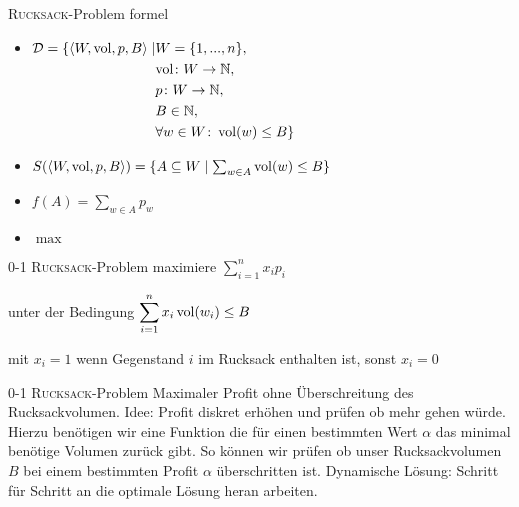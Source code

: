 \begin{frame}{\textsc{Rucksack}-Problem formel}
    \begin{itemize}
        \item $\begin{aligned}[t] 
            \mathcal{D}=\{\langle W,\operatorname{vol},p,B \rangle \mid & W=\{1,...,n\}, & \\
                                                                & \text{vol} \colon W \to \mathbb{N}, & \\
                                                                & p \colon W \to \mathbb{N}, & \\
                                                                & B \in \mathbb{N}, & \\
                                                                & \forall w \in W \colon \operatorname{vol}(w) \leq B \}
         \end{aligned}$
        
        \item $S( \langle W, \text{vol}, p, B \rangle )=\{ A \subseteq W \mid \sum_{w\in A}{ \operatorname{vol}(w)} \leq B \}$
        \item $f(A)=\sum_{w\in A}{p_w}$
        \item $\max$
    \end{itemize}
\end{frame}
\begin{frame}{0-1 \textsc{Rucksack}-Problem}
    maximiere $\displaystyle \sum_{i=1}^{n}{x_i p_i}$
       
    unter der Bedingung $\displaystyle \sum_{i=1}^{n}{x_i \operatorname{vol}(w_i) \leq B}$
       
    mit $x_i=1$ wenn Gegenstand $i$ im Rucksack enthalten ist, sonst $x_i=0$
\end{frame}
\begin{frame}{0-1 \textsc{Rucksack}-Problem}
    Maximaler Profit ohne Überschreitung des Rucksackvolumen.
    Idee: Profit diskret erhöhen und prüfen ob mehr gehen würde.
    Hierzu benötigen wir eine Funktion die für einen bestimmten Wert $\alpha$ das minimal benötige Volumen zurück gibt.
    So können wir prüfen ob unser Rucksackvolumen $B$ bei einem bestimmten Profit $\alpha$ überschritten ist.
    Dynamische Lösung: Schritt für Schritt an die optimale Lösung heran arbeiten.
\end{frame}
